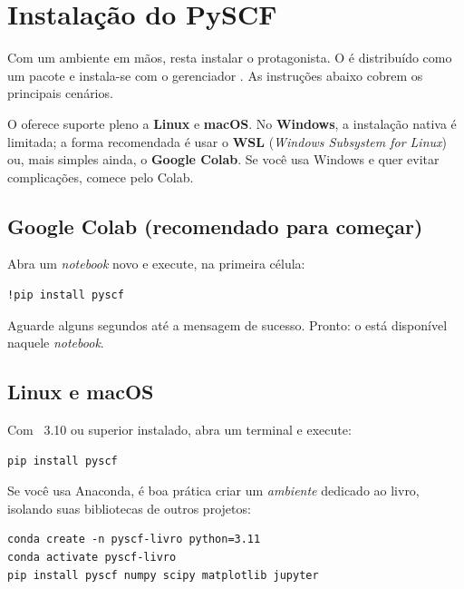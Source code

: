 \section{Instalação do PySCF}
\label{sec:instalacao}

Com um ambiente em mãos, resta instalar o protagonista. O \pyscf{} é distribuído
como um pacote \python{} e instala-se com o gerenciador . As instruções
abaixo cobrem os principais cenários.

\begin{caixaatencao}
O \pyscf{} oferece suporte pleno a \textbf{Linux} e \textbf{macOS}. No
\textbf{Windows}, a instalação nativa é limitada; a forma recomendada é usar o
\textbf{WSL} (\emph{Windows Subsystem for Linux}) ou, mais simples ainda, o
\textbf{Google Colab}. Se você usa Windows e quer evitar complicações, comece
pelo Colab.
\end{caixaatencao}

\subsection{Google Colab (recomendado para começar)}

Abra um \emph{notebook} novo e execute, na primeira célula:

\begin{lstlisting}[style=console]
!pip install pyscf
\end{lstlisting}

\noindent
Aguarde alguns segundos até a mensagem de sucesso. Pronto: o \pyscf{} está
disponível naquele \emph{notebook}.

\subsection{Linux e macOS}

Com \python{}~3.10 ou superior instalado, abra um terminal e execute:

\begin{lstlisting}[style=console]
pip install pyscf
\end{lstlisting}

\noindent
Se você usa Anaconda, é boa prática criar um \emph{ambiente} dedicado ao livro,
isolando suas bibliotecas de outros projetos:

\begin{lstlisting}[style=console]
conda create -n pyscf-livro python=3.11
conda activate pyscf-livro
pip install pyscf numpy scipy matplotlib jupyter
\end{lstlisting}


